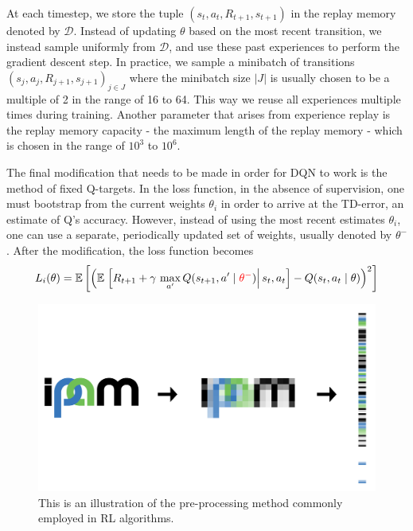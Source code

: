 At each timestep, we store the tuple $(s_t, a_t, R_{t+1}, s_{t+1})$ in the replay memory denoted by 
$\mathcal{D}$. Instead of updating $\theta$ based on the most recent transition, we instead sample 
uniformly from $\mathcal{D}$, and use these past experiences to perform the gradient descent step. 
In practice, we sample a minibatch of transitions $(s_j, a_j, R_{j+1}, s_{j+1})_{j \in J}$ where the 
minibatch size $|J|$ is usually chosen to be a multiple of 2 in the range of 16 to 64. This way we reuse all experiences
 multiple times during training. Another parameter that arises from experience replay is the replay 
 memory capacity - the maximum length of the replay memory - which is chosen in the range of $10^3$ to $10^6$.

The final modification that needs to be made in order for DQN to work is the method of fixed Q-targets. 
In the loss function, in the absence of supervision, one must bootstrap from the current weights $\theta_i$ 
in order to arrive at the TD-error, an estimate of Q's accuracy. However, instead of using the most recent 
estimates $\theta_i$, one can use a separate, periodically updated set of weights, usually denoted by $\theta^-$. 
After the modification, the loss function becomes 
\begin{align}
L_i(\theta) = \mathbb{E} \left[ \left( \mathbb{E}\left.\left[ R_{t+1} + \gamma\, \max\limits_{a'} Q(s_{t+1}, a' \mid {\color{red} \theta^-}) \right| s_t, a_t \right] - Q(s_t, a_t \mid \theta) \right)^2 \right]
\end{align}

\begin{figure}[h!]
\centering\includegraphics[scale=0.25,clip]{Graphics/ipam.png}
\caption[Downsampling and Flattening the Logo of IPAM]{This is an illustration of the pre-processing method commonly employed in RL algorithms.}
\label{fig:ipam}
\end{figure}

